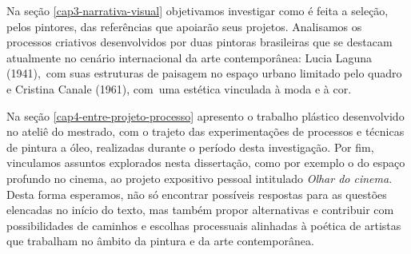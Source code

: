 Na seção \cref{cap3-narrativa-visual} objetivamos investigar como é feita a
seleção, pelos pintores, das referências que apoiarão seus projetos.
Analisamos os processos criativos desenvolvidos por duas pintoras
brasileiras que se destacam atualmente no cenário internacional da arte
contemporânea: Lucia Laguna (1941),~com suas estruturas de paisagem no
espaço urbano limitado pelo quadro e Cristina Canale (1961), com~uma
estética vinculada à moda e à cor.

Na seção \cref{cap4-entre-projeto-processo} apresento o trabalho plástico
desenvolvido no ateliê do mestrado, com o trajeto das experimentações
de processos e técnicas de pintura a óleo, realizadas durante o período
desta investigação. Por fim, vinculamos assuntos explorados nesta
dissertação, como por exemplo o do espaço profundo no cinema, ao
projeto expositivo pessoal intitulado \emph{Olhar do cinema}. Desta
forma esperamos, não só encontrar possíveis respostas para as questões
elencadas no início do texto, mas também propor alternativas e
contribuir com possibilidades de caminhos e escolhas processuais
alinhadas à poética de artistas que trabalham no âmbito da pintura e da
arte contemporânea.
